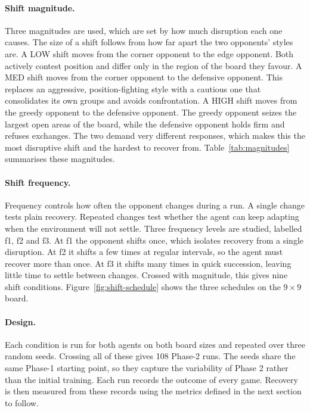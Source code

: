\documentclass[sigconf,nonacm]{acmart}
\begin{document}
\paragraph{Shift magnitude.} Three magnitudes are used, which are set by how much disruption
each one causes. The size of a shift follows from how
far apart the two opponents' styles are. A LOW shift moves from the corner opponent
to the edge opponent. Both actively contest position and differ only in the region
of the board they favour. A MED shift moves from the corner
opponent to the defensive opponent. This replaces an aggressive, position-fighting
style with a cautious one that consolidates its own groups and avoids
confrontation. A HIGH shift moves from the greedy opponent to
the defensive opponent. The greedy opponent seizes the largest open areas of the
board, while the defensive opponent holds firm and refuses exchanges. The two demand very different responses, which makes this the most disruptive shift and the hardest to recover from. Table~\ref{tab:magnitudes} summarises these magnitudes.

\paragraph{Shift frequency.} Frequency controls how often the opponent changes
during a run. A single change tests plain recovery. Repeated changes test whether
the agent can keep adapting when the environment will not settle. Three frequency levels are studied, labelled f1, f2 and f3. At f1 the
opponent shifts once, which isolates recovery from a single disruption. At f2 it
shifts a few times at regular intervals, so the agent must recover more than once.
At f3 it shifts many times in quick succession, leaving little time to settle
between changes. Crossed with magnitude, this gives nine shift conditions. Figure~\ref{fig:shift-schedule} shows the three schedules on the $9\times9$
board.


\paragraph{Design.} Each condition is run for both agents on both board sizes and
repeated over three random seeds. Crossing all of these gives 108 Phase-2 runs.
The seeds share the same Phase-1 starting point, so they capture the variability
of Phase 2 rather than the initial training. Each run records the outcome of
every game. Recovery is then measured from these records using the metrics
defined in the next section to follow.
\end{document}

